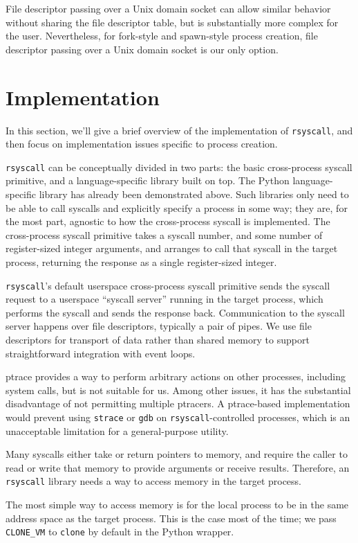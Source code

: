 \documentclass[letterpaper,twocolumn,10pt]{article}
\begin{document}
File descriptor passing over a Unix domain socket
can allow similar behavior without sharing the file descriptor table,
but is substantially more complex for the user.
Nevertheless, for fork-style and spawn-style process creation,
file descriptor passing over a Unix domain socket
is our only option.
\section{Implementation}\label{implementation}
In this section, we'll give a brief overview of the implementation of \texttt{rsyscall},
and then focus on implementation issues specific to process creation.

\texttt{rsyscall} can be conceptually divided in two parts:
the basic cross-process syscall primitive,
and a language-specific library built on top.
The Python language-specific library has already been demonstrated above.
Such libraries only need to be able to call syscalls and explicitly specify a process in some way;
they are, for the most part, agnostic to how the cross-process syscall is implemented.
The cross-process syscall primitive takes a syscall number, and some number of register-sized integer arguments,
and arranges to call that syscall in the target process,
returning the response as a single register-sized integer.

\texttt{rsyscall}'s default userspace cross-process syscall primitive sends the syscall request
to a userspace ``syscall server'' running in the target process,
which performs the syscall and sends the response back.
Communication to the syscall server happens over file descriptors,
typically a pair of pipes.
We use file descriptors for transport of data rather than shared memory
to support straightforward integration with event loops.

ptrace provides a way to perform arbitrary actions on other processes,
including system calls,
but is not suitable for us.
Among other issues, it has the substantial disadvantage of not permitting multiple ptracers.
A ptrace-based implementation would prevent using \texttt{strace} or \texttt{gdb} on \texttt{rsyscall}-controlled processes,
which is an unacceptable limitation for a general-purpose utility.

Many syscalls either take or return pointers to memory,
and require the caller to read or write that memory to provide arguments or receive results.
Therefore, an \texttt{rsyscall} library needs a way to access memory in the target process.

The most simple way to access memory is for the local process to be in the same address space as the target process.
This is the case most of the time; we pass \verb|CLONE_VM| to \texttt{clone} by default in the Python wrapper.
\end{document}
